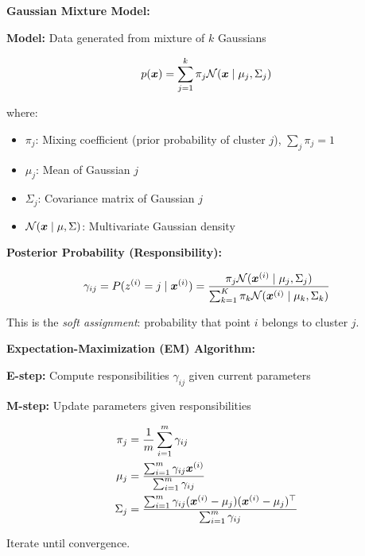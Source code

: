 \begin{seanbox}{4.4}
\textbf{Gaussian Mixture Model:}

\textbf{Model:} Data generated from mixture of $k$ Gaussians

\begin{equation}
    p(\bm{x}) = \sum_{j=1}^k \pi_j \mathcal{N}(\bm{x} \mid \mu_j, \Sigma_j)
\end{equation}

where:
\begin{itemize}
    \item $\pi_j$: Mixing coefficient (prior probability of cluster $j$), $\sum_j \pi_j = 1$
    \item $\mu_j$: Mean of Gaussian $j$
    \item $\Sigma_j$: Covariance matrix of Gaussian $j$
    \item $\mathcal{N}(\bm{x} \mid \mu, \Sigma)$: Multivariate Gaussian density
\end{itemize}

\textbf{Posterior Probability (Responsibility):}

\begin{equation}
    \gamma_{ij} = P(z^{(i)} = j \mid \bm{x}^{(i)}) = \frac{\pi_j \mathcal{N}(\bm{x}^{(i)} \mid \mu_j, \Sigma_j)}{\sum_{k=1}^K \pi_k \mathcal{N}(\bm{x}^{(i)} \mid \mu_k, \Sigma_k)}
\end{equation}

This is the \textit{soft assignment}: probability that point $i$ belongs to cluster $j$.

\textbf{Expectation-Maximization (EM) Algorithm:}

\textbf{E-step:} Compute responsibilities $\gamma_{ij}$ given current parameters

\textbf{M-step:} Update parameters given responsibilities

\begin{align}
    \pi_j &= \frac{1}{m} \sum_{i=1}^m \gamma_{ij} \\
    \mu_j &= \frac{\sum_{i=1}^m \gamma_{ij} \bm{x}^{(i)}}{\sum_{i=1}^m \gamma_{ij}} \\
    \Sigma_j &= \frac{\sum_{i=1}^m \gamma_{ij} (\bm{x}^{(i)} - \mu_j)(\bm{x}^{(i)} - \mu_j)^\top}{\sum_{i=1}^m \gamma_{ij}}
\end{align}

Iterate until convergence.
\end{seanbox}

